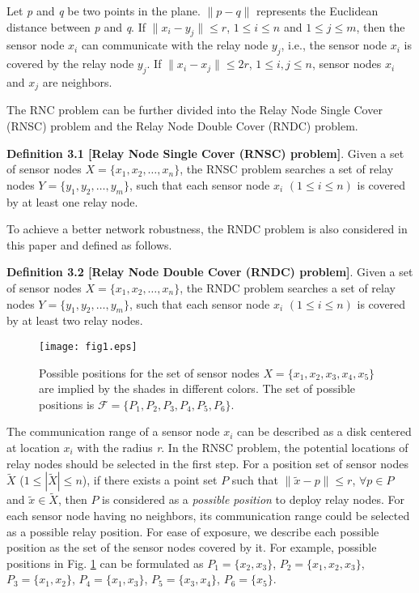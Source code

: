 \documentclass[journal]{IEEEtran}
\begin{document}
Let \emph{p} and \emph{q} be two points in the plane. $\|p-q\|$ represents the Euclidean distance between \emph{p} and \emph{q}. If $\|x_i-y_j\|\leq r$, $1\leq i\leq n$ and $1\leq j\leq m$, then the sensor node $x_i$ can communicate with the relay node $y_j$, i.e., the sensor node $x_i$ is covered by the relay node $y_j$. If $\|x_i-x_j\|\leq 2r$, $1\leq i,j\leq n$, sensor nodes $x_i$ and $x_j$ are neighbors.

The RNC problem can be further divided into the Relay Node Single Cover (RNSC) problem and the Relay Node Double Cover (RNDC) problem.

\textbf{Definition 3.1 [Relay Node Single Cover (RNSC) problem]}. Given a set of sensor nodes $X=\{x_1, x_2,\ldots, x_n\}$, the RNSC problem searches a
set of relay nodes $Y=\{y_1, y_2, \ldots, y_m\}$, such that each sensor node $x_i$ $(1\leq i \leq n)$ is covered by at least one relay node.

To achieve a better network robustness, the RNDC problem is also considered in this paper and defined as follows.

\textbf{Definition 3.2 [Relay Node Double Cover (RNDC) problem]}. Given a set of sensor nodes $X=\{x_1, x_2,\ldots, x_n\}$, the RNDC problem searches a
set of relay nodes $Y=\{y_1, y_2, \ldots, y_m\}$, such that each sensor node $x_i$ $(1\leq i \leq n)$ is covered by at least two relay nodes.

\begin{figure}
\begin{center}
\texttt{[image: fig1.eps]}    \caption{Possible positions for the set of sensor nodes $X=\{x_1, x_2, x_3, x_4, x_5\}$ are implied by the shades in different colors. The set of possible positions is $\mathcal{F} =\{P_1, P_2, P_3, P_4, P_5, P_6\}$.}
\label{fig1}                                 \end{center}                                 \end{figure}

The communication range of a sensor node $x_i$ can be described as a disk centered at location $x_i$ with the radius \emph{r}. In the RNSC problem, the potential locations of relay nodes should be selected in the first step. For a position set
 of sensor nodes $\tilde{X}$ ($1\leq |\tilde{X}|\leq n$), if there exists a point set $P$ such that $\|\tilde{x}-p\|\leq r$, $\forall p\in P$ and $\tilde{x}\in\tilde{X}$, then $P$ is considered as a \emph{possible position} to deploy relay nodes. For each sensor node having no neighbors, its communication range could be selected as a possible relay position. For ease of exposure, we describe each possible position as the set of the sensor nodes covered by it. For example, possible positions in Fig. \ref{fig1} can be formulated as $P_1=\{x_2, x_3\}$, $P_2=\{x_1, x_2, x_3\}$, $P_3=\{x_1, x_2\}$, $P_4=\{x_1, x_3\}$, $P_5=\{x_3, x_4\}$, $P_6=\{x_5\}$.
\end{document}
